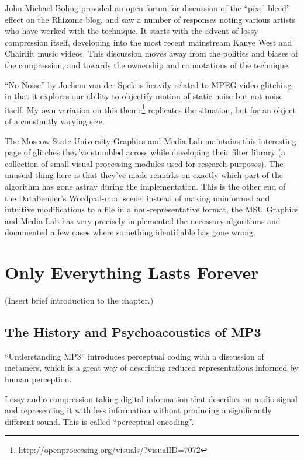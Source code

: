 \documentclass{thesis}
\begin{document}
	John Michael Boling provided an open forum for discussion of the ``pixel bleed'' effect on the Rhizome blog\cite{john_michael_boling_rhizome_????}, and saw a number of responses noting various artists who have worked with the technique. It starts with the advent of lossy compression itself, developing into the most recent mainstream Kanye West and Chairlift music videos. This discussion moves away from the politics and biases of the compression, and towards the ownership and connotations of the technique.
	
	``No Noise'' by Jochem van der Spek\cite{jochem_van_der_spek_no_2001} is heavily related to MPEG video glitching in that it explores our ability to objectify motion of static noise but not noise itself. My own variation on this theme\footnote{\url{http://openprocessing.org/visuals/?visualID=7072}} replicates the situation, but for an object of a constantly varying size.
	
	The Moscow State University Graphics and Media Lab maintains this interesting page of glitches\cite{nikolai_trunichkin_and_dr._dmitriy_vatolin_crazy_????} they've stumbled across while developing their filter library (a collection of small visual processing modules used for research purposes). The unusual thing here is that they've made remarks on exactly which part of the algorithm has gone astray during the implementation. This is the other end of the Databender's Wordpad-mod scene: instead of making uninformed and intuitive modifications to a file in a non-representative format, the MSU Graphics and Media Lab has very precisely implemented the necessary algorithms and documented a few cases where something identifiable has gone wrong.
	
\chapter{Only Everything Lasts Forever}
(Insert brief introduction to the chapter.)

\section{The History and Psychoacoustics of MP3}
``Understanding MP3'' introduces perceptual coding with a discussion of metamers, which is a great way of describing reduced representations informed by human perception.

Lossy audio compression taking digital information that describes an audio signal and representing it with less information without producing a significantly different sound. This is called ``perceptual encoding''.\cite{Ruckert05}
\end{document}

